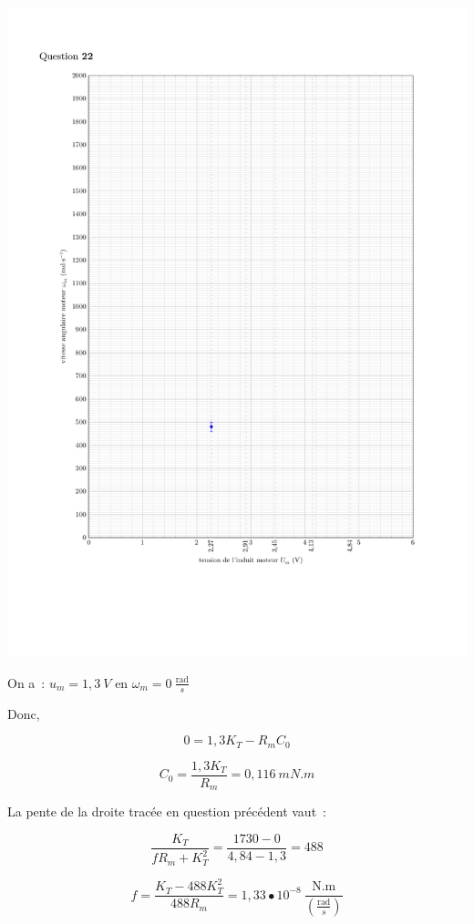 {
\begin{center}
\includegraphics[width=1.0\textwidth]{images/courbe_dr.pdf}
\end{center}
}



\begin{texteCache}
On a~: \(u_{m} = 1,3\ V\) en \(\omega_{m} = 0\ \frac{\text{rad}}{s}\)
 
Donc,

\[0 = 1,3K_{T} - R_{m}C_{0}\]

\[C_{0} = \frac{1,3K_{T}}{R_{m}} = 0,116\ mN.m\]

La pente de la droite tracée en question précédent vaut~:

\[\frac{K_{T}}{fR_{m} + K_{T}^{2}} = \frac{1730 - 0}{4,84 - 1,3} = 488\]

\[f = \frac{K_{T} - 488K_{T}^{2}}{488R_{m}} = 1,33 \bullet 10^{- 8}\ \frac{\text{N.m}}{\left( \frac{\text{rad}}{s} \right)}\]
\end{texteCache}

